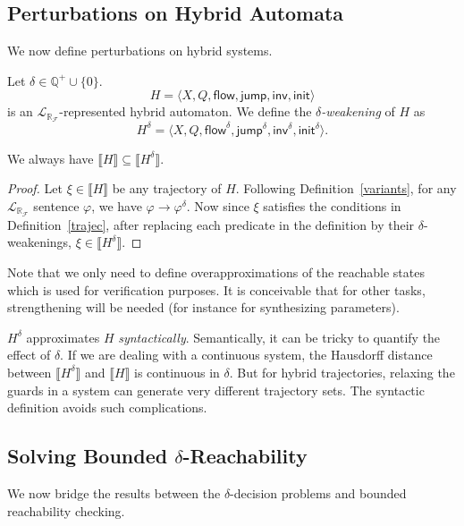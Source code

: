 \documentclass[envcountsect]{llncs}
\newcommand{\flow}{\mathsf{flow}}
\newcommand{\jump}{\mathsf{jump}}
\newcommand{\inv}{\mathsf{inv}}
\newcommand{\init}{\mathsf{init}}
\newcommand{\lrf}{\mathcal{L}_{\mathbb{R}_{\mathcal{F}}}}
\begin{document}
\subsection{Perturbations on Hybrid Automata}
We now define perturbations on hybrid systems.
\begin{definition}
Let $\delta\in\mathbb{Q}^+\cup\{0\}$. 
$$H = \langle X, Q, \flow, \jump, \inv, \init\rangle$$
is an $\lrf$-represented hybrid automaton. We define the {\em
$\delta$-weakening} of $H$ as
$$H^{\delta} = \langle X, Q, \flow^{\delta}, \jump^{\delta}, \inv^{\delta},
\init^{\delta}\rangle.$$
\end{definition}
\begin{proposition} We always have $\llbracket H\rrbracket\subseteq \llbracket
H^{\delta}\rrbracket.$
\end{proposition}
\begin{proof}
Let $\xi\in \llbracket H\rrbracket$ be any trajectory of $H$. Following
Definition~\ref{variants}, for any $\lrf$ sentence $\varphi$, we have 
$\varphi\rightarrow\varphi^{\delta}$. Now since
$\xi$ satisfies the conditions in Definition~\ref{trajec}, after replacing each
predicate in the definition by their $\delta$-weakenings, $\xi\in
\llbracket H^{\delta}\rrbracket$.
\end{proof}
\begin{remark}
Note that we only need to define overapproximations of the reachable states
which is used for verification purposes. It is conceivable that for other tasks,
strengthening will be needed (for instance for synthesizing parameters). 
\end{remark}

\begin{remark}
$H^{\delta}$ approximates $H$ {\em syntactically}. Semantically, it can be
tricky to quantify the effect of $\delta$. If we are dealing with a continuous
system, the Hausdorff distance between $\llbracket
H^{\delta}\rrbracket$ and $\llbracket H\rrbracket$ is continuous in
$\delta$. But for hybrid trajectories, relaxing the guards in a system can
generate very different trajectory sets. The syntactic
definition avoids such complications. 
\end{remark}

\subsection{Solving Bounded $\delta$-Reachability}

We now bridge the results between the $\delta$-decision problems and bounded
reachability checking. 
\end{document}

